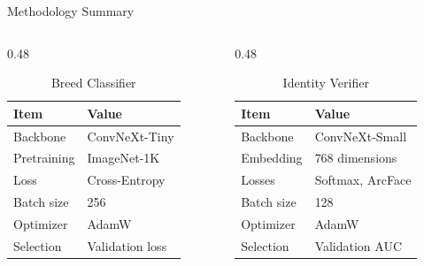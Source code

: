 \documentclass[aspectratio=169,11pt]{beamer}
\begin{document}
\begin{frame}{Methodology Summary}
  \begin{columns}[T,onlytextwidth]
    \begin{column}{0.48\textwidth}
      \begin{table}
        \centering
        \caption{Breed Classifier}
        \small
        \begin{tabular}{ll}
          \toprule
          Item & Value \\
          \midrule
          Backbone & ConvNeXt-Tiny \\
          Pretraining & ImageNet-1K \\
          Loss & Cross-Entropy \\
          Batch size & 256 \\
          Optimizer & AdamW \\
          Selection & Validation loss \\
          \bottomrule
        \end{tabular}
      \end{table}
    \end{column}
    \begin{column}{0.48\textwidth}
      \begin{table}
        \centering
        \caption{Identity Verifier}
        \small
        \begin{tabular}{ll}
          \toprule
          Item & Value \\
          \midrule
          Backbone & ConvNeXt-Small \\
          Embedding & 768 dimensions \\
          Losses & Softmax, ArcFace \\
          Batch size & 128 \\
          Optimizer & AdamW \\
          Selection & Validation AUC \\
          \bottomrule
        \end{tabular}
      \end{table}
    \end{column}
  \end{columns}
\end{frame}
\end{document}
